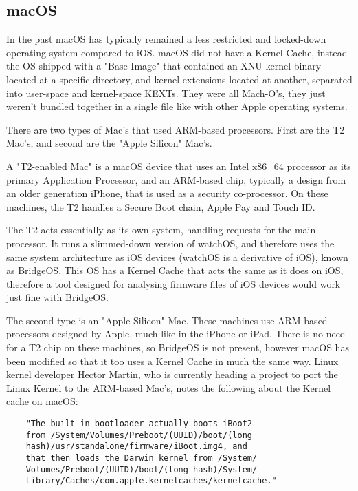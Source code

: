 \subsection{macOS}


In the past macOS has typically remained a less restricted and locked-down operating system compared to iOS. macOS did not have a Kernel Cache, instead the OS shipped with a "Base Image" that contained an XNU kernel binary located at a specific directory, and kernel extensions located at another, separated into user-space and kernel-space KEXTs. They were all Mach-O's, they just weren't bundled together in a single file like with other Apple operating systems.


There are two types of Mac's that used ARM-based processors. First are the T2 Mac's, and second are the "Apple Silicon" Mac's.

A "T2-enabled Mac" is a macOS device that uses an Intel x86\_64 processor as its primary Application Processor, and an ARM-based chip, typically a design from an older generation iPhone, that is used as a security co-processor. On these machines, the T2 handles a Secure Boot chain, Apple Pay and Touch ID. \cite{duo-labs-t2-intro}

The T2 acts essentially as its own system, handling requests for the main processor. It runs a slimmed-down version of watchOS, and therefore uses the same system architecture as iOS devices (watchOS is a derivative of iOS), known as BridgeOS. This OS has a Kernel Cache that acts the same as it does on iOS, therefore a tool designed for analysing firmware files of iOS devices would work just fine with BridgeOS.

The second type is an "Apple Silicon" Mac. These machines use ARM-based processors designed by Apple, much like in the iPhone or iPad. There is no need for a T2 chip on these machines, so BridgeOS is not present, however macOS has been modified so that it too uses a Kernel Cache in much the same way. Linux kernel developer Hector Martin, who is currently heading a project to port the Linux Kernel to the ARM-based Mac's, notes the following about the Kernel cache on macOS:

\begin{verbatim}
	"The built-in bootloader actually boots iBoot2 
	from /System/Volumes/Preboot/(UUID)/boot/(long 
	hash)/usr/standalone/firmware/iBoot.img4, and 
	that then loads the Darwin kernel from /System/
	Volumes/Preboot/(UUID)/boot/(long hash)/System/
	Library/Caches/com.apple.kernelcaches/kernelcache."
\end{verbatim}


